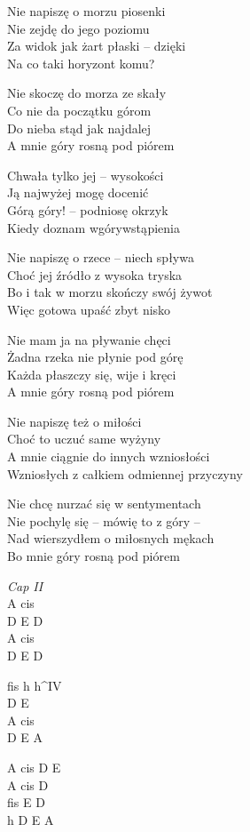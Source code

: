 \begin{text}
    \hfill\break
    Nie napiszę o morzu piosenki\\
    Nie zejdę do jego poziomu\\
    Za widok jak żart płaski -- dzięki\\
    Na co taki horyzont komu?

    Nie skoczę do morza ze skały\\
    Co nie da początku górom\\
    Do nieba stąd jak najdalej\\
    A mnie góry rosną pod piórem

    \vin Chwała tylko jej -- wysokości\\
    \vin Ją najwyżej mogę docenić\\
    \vin Górą góry! -- podniosę okrzyk\\
    \vin Kiedy doznam wgórywstąpienia

    Nie napiszę o rzece -- niech spływa\\
    Choć jej źródło z wysoka tryska\\
    Bo i tak w morzu skończy swój żywot\\
    Więc gotowa upaść zbyt nisko

    Nie mam ja na pływanie chęci\\
    Żadna rzeka nie płynie pod górę\\
    Każda płaszczy się, wije i kręci\\
    A mnie góry rosną pod piórem

    Nie napiszę też o miłości\\
    Choć to uczuć same wyżyny\\
    A mnie ciągnie do innych wzniosłości\\
    Wzniosłych z całkiem odmiennej przyczyny

    Nie chcę nurzać się w sentymentach\\
    Nie pochylę się -- mówię to z góry --\\
    Nad wierszydłem o miłosnych mękach\\
    Bo mnie góry rosną pod piórem
\end{text}
\begin{chord}
    \textit{Cap II}\\
    A cis\\
    D E D\\
    A cis\\
    D E D

    fis h h^{IV}\\
    D E\\
    A cis\\
    D E A

    A cis D E\\
    A cis D\\
    fis E D\\
    h D E A
\end{chord}